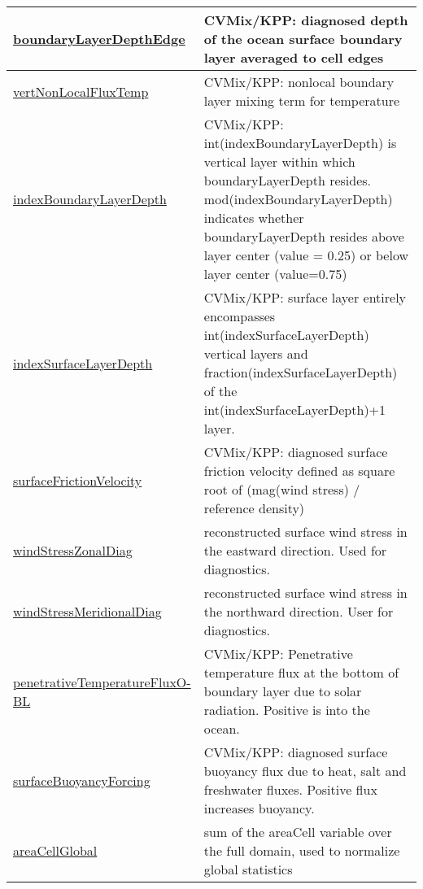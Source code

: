 {\begin{center}
\begin{longtable}{| p{2.0in} | p{4.0in} |}
	\hline
	\hyperref[subsec:var_sec_diagnostics_boundaryLayerDepthEdge]{boundaryLayerDepthEdge} & CVMix/KPP: diagnosed depth of the ocean surface boundary layer averaged to cell edges \\
	\hline
	\hyperref[subsec:var_sec_diagnostics_vertNonLocalFluxTemp]{vertNonLocalFluxTemp} & CVMix/KPP: nonlocal boundary layer mixing term for temperature \\
	\hline
	\hyperref[subsec:var_sec_diagnostics_indexBoundaryLayerDepth]{indexBoundaryLayerDepth} & CVMix/KPP: int(indexBoundaryLayerDepth) is vertical layer within which boundaryLayerDepth resides. mod(indexBoundaryLayerDepth) indicates whether boundaryLayerDepth resides above layer center (value = 0.25) or below layer center (value=0.75) \\
	\hline
	\hyperref[subsec:var_sec_diagnostics_indexSurfaceLayerDepth]{indexSurfaceLayerDepth} & CVMix/KPP: surface layer entirely encompasses int(indexSurfaceLayerDepth) vertical layers and fraction(indexSurfaceLayerDepth) of the int(indexSurfaceLayerDepth)+1 layer. \\
	\hline
	\hyperref[subsec:var_sec_diagnostics_surfaceFrictionVelocity]{surfaceFrictionVelocity} & CVMix/KPP: diagnosed surface friction velocity defined as square root of (mag(wind stress) / reference density) \\
	\hline
	\hyperref[subsec:var_sec_diagnostics_windStressZonalDiag]{windStressZonalDiag} & reconstructed surface wind stress in the eastward direction. Used for diagnostics. \\
	\hline
	\hyperref[subsec:var_sec_diagnostics_windStressMeridionalDiag]{windStressMeridionalDiag} & reconstructed surface wind stress in the northward direction. User for diagnostics. \\
	\hline
	\hyperref[subsec:var_sec_diagnostics_penetrativeTemperatureFluxOBL]{penetrativeTemperatureFluxO-}\hyperref[subsec:var_sec_diagnostics_penetrativeTemperatureFluxOBL]{BL  }& CVMix/KPP: Penetrative temperature flux at the bottom of boundary layer due to solar radiation. Positive is into the ocean. \\
	\hline
	\hyperref[subsec:var_sec_diagnostics_surfaceBuoyancyForcing]{surfaceBuoyancyForcing} & CVMix/KPP: diagnosed surface buoyancy flux due to heat, salt and freshwater fluxes. Positive flux increases buoyancy. \\
	\hline
	\hyperref[subsec:var_sec_diagnostics_areaCellGlobal]{areaCellGlobal} & sum of the areaCell variable over the full domain, used to normalize global statistics \\

\end{longtable}
\end{center}}
